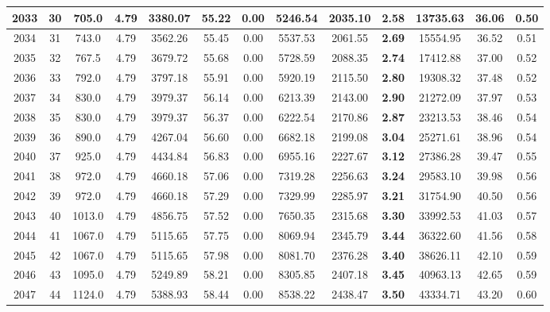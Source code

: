 {\begin{center}
\begin{tabular}[htb]{|c|c||c|c|c|c|c|c||c|c||c|c|c||}
\hline 
 2033 &  30 &  705.0 &  4.79 &  3380.07 &  55.22 &  0.00 &  5246.54 &  2035.10 &  {\bf 2.58} &  13735.63 &  36.06 &  0.50 \\ 
\hline 
 2034 &  31 &  743.0 &  4.79 &  3562.26 &  55.45 &  0.00 &  5537.53 &  2061.55 &  {\bf 2.69} &  15554.95 &  36.52 &  0.51 \\ 
\hline 
 2035 &  32 &  767.5 &  4.79 &  3679.72 &  55.68 &  0.00 &  5728.59 &  2088.35 &  {\bf 2.74} &  17412.88 &  37.00 &  0.52 \\ 
\hline 
 2036 &  33 &  792.0 &  4.79 &  3797.18 &  55.91 &  0.00 &  5920.19 &  2115.50 &  {\bf 2.80} &  19308.32 &  37.48 &  0.52 \\ 
\hline 
 2037 &  34 &  830.0 &  4.79 &  3979.37 &  56.14 &  0.00 &  6213.39 &  2143.00 &  {\bf 2.90} &  21272.09 &  37.97 &  0.53 \\ 
\hline 
 2038 &  35 &  830.0 &  4.79 &  3979.37 &  56.37 &  0.00 &  6222.54 &  2170.86 &  {\bf 2.87} &  23213.53 &  38.46 &  0.54 \\ 
\hline 
 2039 &  36 &  890.0 &  4.79 &  4267.04 &  56.60 &  0.00 &  6682.18 &  2199.08 &  {\bf 3.04} &  25271.61 &  38.96 &  0.54 \\ 
\hline 
 2040 &  37 &  925.0 &  4.79 &  4434.84 &  56.83 &  0.00 &  6955.16 &  2227.67 &  {\bf 3.12} &  27386.28 &  39.47 &  0.55 \\ 
\hline 
 2041 &  38 &  972.0 &  4.79 &  4660.18 &  57.06 &  0.00 &  7319.28 &  2256.63 &  {\bf 3.24} &  29583.10 &  39.98 &  0.56 \\ 
\hline 
 2042 &  39 &  972.0 &  4.79 &  4660.18 &  57.29 &  0.00 &  7329.99 &  2285.97 &  {\bf 3.21} &  31754.90 &  40.50 &  0.56 \\ 
\hline 
 2043 &  40 &  1013.0 &  4.79 &  4856.75 &  57.52 &  0.00 &  7650.35 &  2315.68 &  {\bf 3.30} &  33992.53 &  41.03 &  0.57 \\ 
\hline 
 2044 &  41 &  1067.0 &  4.79 &  5115.65 &  57.75 &  0.00 &  8069.94 &  2345.79 &  {\bf 3.44} &  36322.60 &  41.56 &  0.58 \\ 
\hline 
 2045 &  42 &  1067.0 &  4.79 &  5115.65 &  57.98 &  0.00 &  8081.70 &  2376.28 &  {\bf 3.40} &  38626.11 &  42.10 &  0.59 \\ 
\hline 
 2046 &  43 &  1095.0 &  4.79 &  5249.89 &  58.21 &  0.00 &  8305.85 &  2407.18 &  {\bf 3.45} &  40963.13 &  42.65 &  0.59 \\ 
\hline 
 2047 &  44 &  1124.0 &  4.79 &  5388.93 &  58.44 &  0.00 &  8538.22 &  2438.47 &  {\bf 3.50} &  43334.71 &  43.20 &  0.60 \\ 

\end{tabular}
\end{center}}
